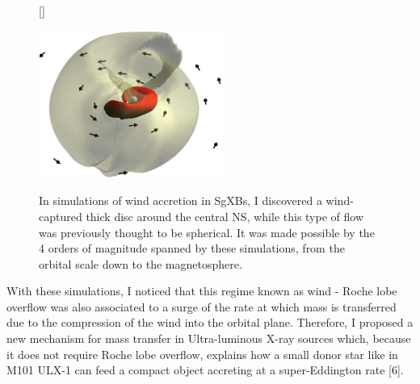 \documentclass[12pt,onecolumn]{article}
\makeatletter
\newcommand{\sgxs}{SgXBs\xspace}
\newcommand*{\ns}{NS\@\xspace}
\makeatother
\begin{document}



\vspace*{-0.3cm}
\begin{figure}[!h]
[\FBwidth]
{\caption{In simulations of wind accretion in \sgxs, I discovered a wind-captured thick disc around the central \ns, while this type of flow was previously thought to be spherical. It was made possible by the 4 orders of magnitude spanned by these simulations, from the orbital scale down to the magnetosphere.}\label{fig:disc}}
{\includegraphics[width=6cm]{Figures/disc.png}}
\vspace*{-0.4cm}
\end{figure}

With these simulations, I noticed that this regime known as wind - Roche lobe overflow was also associated to a surge of the rate at which mass is transferred due to the compression of the wind into the orbital plane. Therefore, I proposed a new mechanism for mass transfer in Ultra-luminous X-ray sources which, because it does not require Roche lobe overflow, explains how a small donor star like in M101 ULX-1 can feed a compact object accreting at a super-Eddington rate [6]. 
\end{document}
